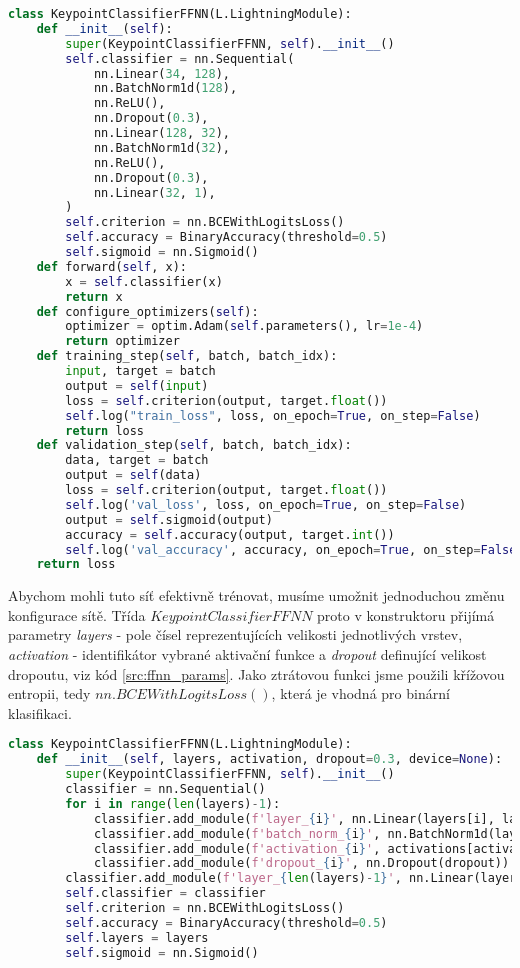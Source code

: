 \begin{lstlisting}[language=Python, label=src:ffnn, caption={Ukázka implementace Dopředné sítě v PyTorch Lightning}]
class KeypointClassifierFFNN(L.LightningModule):
    def __init__(self):
        super(KeypointClassifierFFNN, self).__init__()
        self.classifier = nn.Sequential(
            nn.Linear(34, 128),
            nn.BatchNorm1d(128),
            nn.ReLU(),
            nn.Dropout(0.3),
            nn.Linear(128, 32),
            nn.BatchNorm1d(32),
            nn.ReLU(),
            nn.Dropout(0.3),
            nn.Linear(32, 1),
        )
        self.criterion = nn.BCEWithLogitsLoss()
        self.accuracy = BinaryAccuracy(threshold=0.5)
        self.sigmoid = nn.Sigmoid()    
    def forward(self, x):
        x = self.classifier(x)
        return x
    def configure_optimizers(self):
        optimizer = optim.Adam(self.parameters(), lr=1e-4)
        return optimizer
    def training_step(self, batch, batch_idx):
        input, target = batch
        output = self(input)
        loss = self.criterion(output, target.float())    
        self.log("train_loss", loss, on_epoch=True, on_step=False)
        return loss
    def validation_step(self, batch, batch_idx):
        data, target = batch
        output = self(data)
        loss = self.criterion(output, target.float())
        self.log('val_loss', loss, on_epoch=True, on_step=False)
        output = self.sigmoid(output)
        accuracy = self.accuracy(output, target.int())    
        self.log('val_accuracy', accuracy, on_epoch=True, on_step=False)
    return loss
\end{lstlisting}

Abychom mohli tuto síť efektivně trénovat, musíme umožnit jednoduchou změnu
konfigurace sítě. Třída $KeypointClassifierFFNN$ proto v konstruktoru přijímá
parametry \textit{layers} - pole čísel reprezentujících velikosti jednotlivých
vrstev, \textit{activation} - identifikátor vybrané aktivační funkce a
\textit{dropout} definující velikost dropoutu, viz kód \ref{src:ffnn_params}.
Jako ztrátovou funkci jsme použili křížovou entropii, tedy
$nn.BCEWithLogitsLoss()$, která je vhodná pro binární klasifikaci.

\begin{lstlisting}[language=Python, label=src:ffnn_params, caption={Parametrizace konfigurace dopředné sítě}] 
class KeypointClassifierFFNN(L.LightningModule):
    def __init__(self, layers, activation, dropout=0.3, device=None):
        super(KeypointClassifierFFNN, self).__init__()        
        classifier = nn.Sequential()
        for i in range(len(layers)-1):
            classifier.add_module(f'layer_{i}', nn.Linear(layers[i], layers[i+1]))
            classifier.add_module(f'batch_norm_{i}', nn.BatchNorm1d(layers[i+1]))
            classifier.add_module(f'activation_{i}', activations[activation])
            classifier.add_module(f'dropout_{i}', nn.Dropout(dropout))
        classifier.add_module(f'layer_{len(layers)-1}', nn.Linear(layers[-1], 1))
        self.classifier = classifier
        self.criterion = nn.BCEWithLogitsLoss()
        self.accuracy = BinaryAccuracy(threshold=0.5)
        self.layers = layers
        self.sigmoid = nn.Sigmoid()   
\end{lstlisting}

